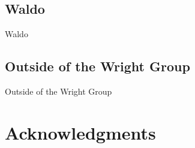 \documentclass{presentation}
\begin{document}
\subsection{Waldo}
\begin{frame}{Waldo}
\end{frame}

\subsection{Outside of the Wright Group}
\begin{frame}{Outside of the Wright Group}
\end{frame}
\section{Acknowledgments}
\end{document}
